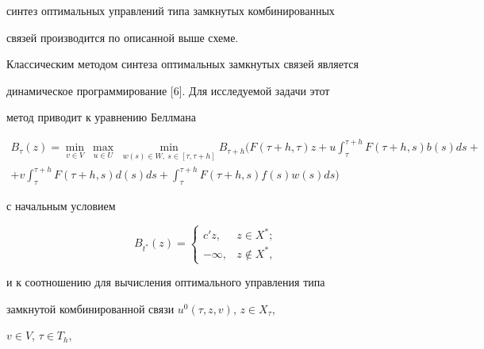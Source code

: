 синтез оптимальных управлений типа замкнутых комбинированных


связей производится по описанной выше схеме.





Классическим методом синтеза оптимальных замкнутых связей является


динамическое программирование [6]. Для исследуемой задачи этот


метод приводит к уравнению Беллмана


\begin{multline}


B_{\tau}(z)=\min_{v \in V}\ \max_{u \in U}\; \min_{w(s) \in W,\ s \in


[\tau, \tau+h]}


B_{\tau+h}\bigg(F(\tau+h,\tau)z+u\int_{\tau}^{\tau+h}F(\tau+h,s)b(s)ds+ \\


%


+v\int_{\tau}^{\tau+h}F(\tau+h,s)d(s)ds+


\int_{\tau}^{\tau+h}F(\tau+h,s)f(s)w(s)ds\bigg)


\end{multline}


с начальным условием


$$


B_{t^*}(z)=


\begin{cases}


c'z, & z \in X^*; \\ -\infty, & z \notin X^*,


\end{cases}


$$


и к соотношению для вычисления оптимального управления типа


замкнутой комбинированной связи $u^0(\tau,z,v)$, $z \in X_{\tau}$,


$v \in V$, $\tau \in T_{h}$,


